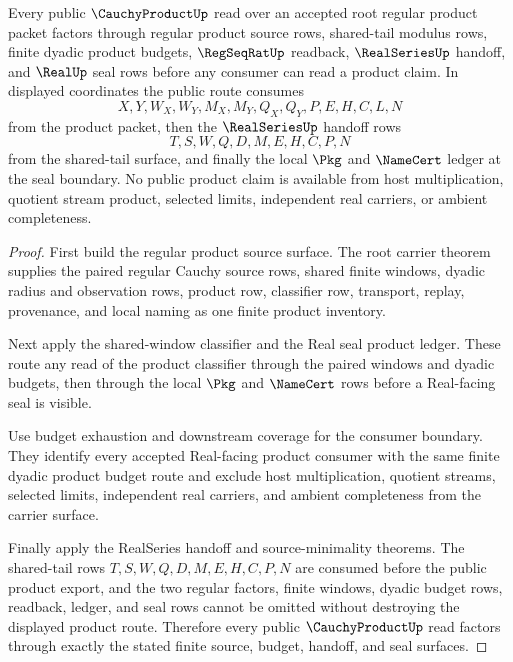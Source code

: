\begin{theorem}
\label{thm:cauchyproduct-mature-public-factorization}
Every public $\CauchyProductUp$ read over an accepted root regular product packet factors through regular product source rows, shared-tail modulus rows, finite dyadic product budgets, $\RegSeqRatUp$ readback, $\RealSeriesUp$ handoff, and $\RealUp$ seal rows before any consumer can read a product claim. In displayed coordinates the public route consumes
$$
X,Y,W_X,W_Y,M_X,M_Y,Q_X,Q_Y,P,E,H,C,L,N
$$
from the product packet, then the $\RealSeriesUp$ handoff rows
$$
T,S,W,Q,D,M,E,H,C,P,N
$$
from the shared-tail surface, and finally the local $\Pkg$ and $\NameCert$ ledger at the seal boundary. No public product claim is available from host multiplication, quotient stream product, selected limits, independent real carriers, or ambient completeness.
\end{theorem}
\begin{proof}
First build the regular product source surface. The root carrier theorem supplies the paired regular Cauchy source rows, shared finite windows, dyadic radius and observation rows, product row, classifier row, transport, replay, provenance, and local naming as one finite product inventory.

Next apply the shared-window classifier and the Real seal product ledger. These route any read of the product classifier through the paired windows and dyadic budgets, then through the local $\Pkg$ and $\NameCert$ rows before a Real-facing seal is visible.

Use budget exhaustion and downstream coverage for the consumer boundary. They identify every accepted Real-facing product consumer with the same finite dyadic product budget route and exclude host multiplication, quotient streams, selected limits, independent real carriers, and ambient completeness from the carrier surface.

Finally apply the RealSeries handoff and source-minimality theorems. The shared-tail rows $T,S,W,Q,D,M,E,H,C,P,N$ are consumed before the public product export, and the two regular factors, finite windows, dyadic budget rows, readback, ledger, and seal rows cannot be omitted without destroying the displayed product route. Therefore every public $\CauchyProductUp$ read factors through exactly the stated finite source, budget, handoff, and seal surfaces.
\end{proof}

